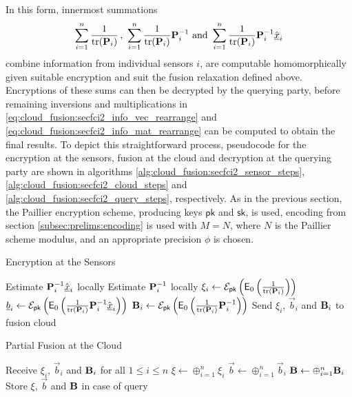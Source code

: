 In this form, innermost summations  
\begin{equation}
    \sum_{i=1}^n \frac{1}{\tr(\mat{P}_i)}\,,\ \sum_{i=1}^n \frac{1}{\tr(\mat{P}_i)}\mat{P}_i^{-1}\text{ and }\sum_{i=1}^n\frac{1}{\tr(\mat{P}_i)}\mat{P}_i^{-1}\hat{\vec{x}}_i
\end{equation}
combine information from individual sensors $i$, are computable homomorphically given suitable encryption and suit the fusion relaxation defined above. Encryptions of these sums can then be decrypted by the querying party, before remaining inversions and multiplications in \eqref{eq:cloud_fusion:secfci2_info_vec_rearrange} and \eqref{eq:cloud_fusion:secfci2_info_mat_rearrange} can be computed to obtain the final results. To depict this straightforward process, pseudocode for the encryption at the sensors, fusion at the cloud and decryption at the querying party are shown in algorithms \ref{alg:cloud_fusion:secfci2_sensor_steps}, \ref{alg:cloud_fusion:secfci2_cloud_steps} and \ref{alg:cloud_fusion:secfci2_query_steps}, respectively. As in the previous section, the Paillier encryption scheme, producing keys $\mathsf{pk}$ and $\mathsf{sk}$, is used, encoding from section \ref{subsec:prelims:encoding} is used with $M=N$, where $N$ is the Paillier scheme modulus, and an appropriate precision $\phi$ is chosen.
\begin{algorithm}[htbp]
\caption{Encryption at the Sensors}\label{alg:cloud_fusion:secfci2_sensor_steps}
\begin{algorithmic}[1]
    \State Estimate ${{\mathbf{P}}}_i^{-1}\hat{{\underline{x}}}_i$ locally
    \State Estimate ${{\mathbf{P}}}_i^{-1}$ locally
    \State $\xi_i \gets \mathcal{E}_{\mathsf{pk}}\left(\mathsf{E}_{0}\left(\frac{1}{\operatorname{tr}({{\mathbf{P}}}_i)}\right)\right)$
    \State ${\underline{b}}_i \gets \mathcal{E}_{\mathsf{pk}}\left(\mathsf{E}_{0}\left(\frac{1}{\operatorname{tr}({{\mathbf{P}}}_i)}{{\mathbf{P}}}_i^{-1}\hat{{\underline{x}}}_i\right)\right)$
    \State ${{\mathbf{B}}}_i \gets \mathcal{E}_{\mathsf{pk}}\left(\mathsf{E}_{0}\left(\frac{1}{\operatorname{tr}({{\mathbf{P}}}_i)}{{\mathbf{P}}}_i^{-1}\right)\right)$
    \State Send $\xi_i$, $\vec{b}_i$ and ${{\mathbf{B}}}_i$ to fusion cloud
    \EndProcedure
\end{algorithmic}
\end{algorithm}
\begin{algorithm}[htbp]
\caption{Partial Fusion at the Cloud}\label{alg:cloud_fusion:secfci2_cloud_steps}
\begin{algorithmic}[1]
    \State Receive $\xi_i$, $\vec{b}_i$ and ${{\mathbf{B}}}_i$ for all $1\leq i \leq n$
    \State $\xi \gets \oplus_{i=1}^{n} \xi_i$
    \State $\vec{b} \gets \oplus_{i=1}^{n} \vec{b}_i$
    \State ${{\mathbf{B}}} \gets \oplus_{i=1}^{n} {{\mathbf{B}}}_i$
    \State Store $\xi$, $\vec{b}$ and ${{\mathbf{B}}}$ in case of query
    \EndProcedure
\end{algorithmic}
\end{algorithm}
